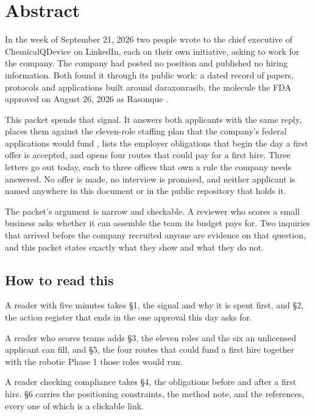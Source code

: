 \section*{Abstract}

In the week of September 21, 2026 two people wrote to the chief executive of
ChemicalQDevice on LinkedIn, each on their own initiative, asking to work for the
company. The company had posted no position and published no hiring information.
Both found it through its public work: a dated record of papers, protocols and
applications built around daraxonrasib, the molecule the FDA approved on August
26, 2026 as Rasonque \cite{fdarasonque2026}.

This packet spends that signal. It answers both applicants with the same reply,
places them against the eleven-role staffing plan that the company's federal
applications would fund \cite{movein2026}, lists the employer obligations that
begin the day a first offer is accepted, and opens four routes that could pay
for a first hire. Three letters go out today, each to three offices that own a
rule the company needs answered. No offer is made, no interview is promised,
and neither applicant is named anywhere in this document or in the public
repository that holds it.

The packet's argument is narrow and checkable. A reviewer who scores a small
business asks whether it can assemble the team its budget pays for. Two
inquiries that arrived before the company recruited anyone are evidence on that
question, and this packet states exactly what they show and what they do not.

\subsection*{How to read this}

A reader with five minutes takes \S1, the signal and why it is spent first, and
\S2, the action register that ends in the one approval this day asks for.

A reader who scores teams adds \S3, the eleven roles and the six an unlicensed
applicant can fill, and \S5, the four routes that could fund a first hire
together with the robotic Phase 1 those roles would run.

A reader checking compliance takes \S4, the obligations before and after a
first hire. \S6 carries the positioning constraints, the method note, and the
references, every one of which is a clickable link.
